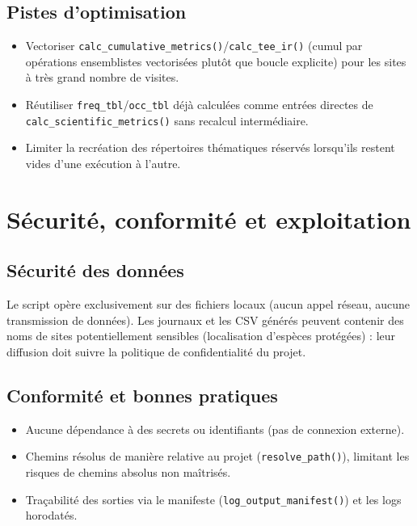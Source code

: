 \documentclass[11pt,a4paper]{article}
\begin{document}
\subsection{Pistes d'optimisation}
\begin{itemize}[leftmargin=1.2cm]
  \item Vectoriser \texttt{calc\_cumulative\_metrics()}/\texttt{calc\_tee\_ir()} (cumul par opérations ensemblistes vectorisées plutôt que boucle explicite) pour les sites à très grand nombre de visites.
  \item Réutiliser \texttt{freq\_tbl}/\texttt{occ\_tbl} déjà calculées comme entrées directes de \texttt{calc\_scientific\_metrics()} sans recalcul intermédiaire.
  \item Limiter la recréation des répertoires thématiques réservés lorsqu'ils restent vides d'une exécution à l'autre.
\end{itemize}

\section{Sécurité, conformité et exploitation}

\subsection{Sécurité des données}
Le script opère exclusivement sur des fichiers locaux (aucun appel réseau, aucune
transmission de données). Les journaux et les CSV générés peuvent contenir des noms de
sites potentiellement sensibles (localisation d'espèces protégées) : leur diffusion doit
suivre la politique de confidentialité du projet.

\subsection{Conformité et bonnes pratiques}
\begin{itemize}[leftmargin=1.2cm]
  \item Aucune dépendance à des secrets ou identifiants (pas de connexion externe).
  \item Chemins résolus de manière relative au projet (\texttt{resolve\_path()}), limitant les risques de chemins absolus non maîtrisés.
  \item Traçabilité des sorties via le manifeste (\texttt{log\_output\_manifest()}) et les logs horodatés.
\end{itemize}
\end{document}
